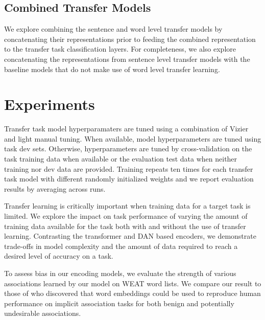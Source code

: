 \documentclass[11pt,a4paper]{article}
\begin{document}
\subsection{Combined Transfer Models}

We explore combining the sentence and word level transfer models by concatenating their representations prior to feeding the combined representation to the transfer task classification layers. For completeness, we also explore concatenating the representations from sentence level transfer models with the baseline models that do not make use of word level transfer learning.

\section{Experiments}
Transfer task model hyperparamaters are tuned using a combination of Vizier \cite{golovin2017} and light manual tuning. When available, model hyperparameters are tuned using task dev sets. Otherwise, hyperparameters are tuned by cross-validation on the task training data when available or the evaluation test data when neither training nor dev data are provided. Training repeats ten times for each transfer task model with different randomly initialized weights and we report evaluation results by averaging across runs.

Transfer learning is critically important when training data for a target task is limited. We explore the impact on task performance of varying the amount of training data available for the task both with and without the use of transfer learning. Contrasting the transformer and DAN based encoders, we demonstrate trade-offs in model complexity and the amount of data required to reach a desired level of accuracy on a task.

To assess bias in our encoding models, we evaluate the strength of various associations learned by our model on WEAT word lists. We compare our result to those of  who discovered that word embeddings could be used to reproduce human performance on implicit association tasks for both benign and potentially undesirable associations. 
\end{document}
